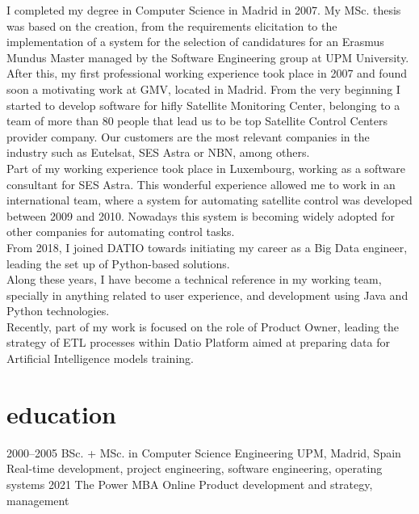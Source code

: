 \documentclass[]{friggeri-cv}
\begin{document}
{\headingfont I completed my degree} in Computer Science in Madrid in 2007. My MSc. thesis was based on 
the creation, from the requirements elicitation to the implementation of a system for the selection of candidatures for an
Erasmus Mundus Master managed by the Software Engineering group at UPM University. \\
{\headingfont After this, my first professional working experience} took place in 2007 and found soon a motivating work 
at GMV, located in Madrid. From the very beginning I started to develop software for hifly Satellite Monitoring Center,
belonging to a team of more than 80 people that lead us to be top Satellite Control Centers provider company. 
Our customers are the most relevant companies in the industry such as Eutelsat, SES Astra or NBN, among others. \\
{\headingfont Part of my working experience took place in Luxembourg,} working as a software consultant for SES Astra.
This wonderful experience allowed me to work in an international team, where a system for automating satellite control
was developed between 2009 and 2010. Nowadays this system is becoming widely adopted for other companies for automating
control tasks. \\
{\headingfont From 2018, I joined DATIO towards initiating my career as a Big Data engineer}, leading the set up of Python-based
solutions. \\
Along these years, I have become a technical reference in my working team, specially in anything related
to user experience, and development using Java and Python technologies. \\
{\headingfont Recently, part of my work is focused on the role of Product Owner}, leading the strategy of ETL processes within 
Datio Platform aimed at preparing data for Artificial Intelligence models training. \\


\section{education}

\begin{entrylist}
\entry
{2000--2005}
{BSc. + MSc. {\normalfont in Computer Science Engineering}}
{UPM, Madrid, Spain}
{Real-time development, project engineering, software engineering, operating systems}
\entry
{2021}
{{\normalfont The Power MBA}}
{Online}
{Product development and strategy, management}
\end{entrylist}
\end{document}
